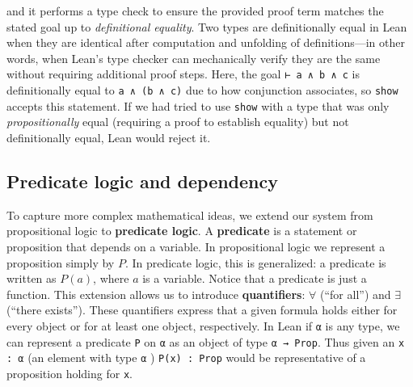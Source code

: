 \begin{example}
  and it performs a type check to ensure the provided proof term matches the stated
  goal up to \emph{definitional equality}.
  Two types are definitionally equal in Lean when they are identical after computation
  and unfolding of definitions—in other words, when Lean's type checker
  can mechanically verify they are the same without requiring additional proof steps.
  Here, the goal \lstinline[language=lean]|⊢ a ∧ b ∧ c| is definitionally
  equal to \lstinline[language=lean]|a ∧ (b ∧ c)| due to how conjunction
  associates, so \lstinline[language=lean]|show| accepts this statement.
  If we had tried to use \lstinline[language=lean]|show| with a type that
  was only \emph{propositionally} equal (requiring a proof to establish equality)
  but not definitionally equal, Lean would reject it.
\end{example}
\subsection{Predicate logic and dependency}
To capture more complex mathematical ideas, we extend our system from
propositional logic to \textbf{predicate logic}.
A \textbf{predicate} is a statement or proposition that depends on a variable.
In propositional logic we represent a proposition simply by $P$.
In predicate logic, this is generalized: a predicate is written as $P(a)$,
where $a$ is a variable. Notice that a predicate is just a function.
This extension allows us to introduce \textbf{quantifiers}:
$\forall$ (``for all'') and $\exists$ (``there exists'').
These quantifiers express that a given formula holds either for every object
or for at least one object, respectively.
In Lean if \lstinline[language=lean]|α| is any type, we can represent a
predicate \lstinline[language=lean]|P| on \lstinline[language=lean]|α| as
an object of type \lstinline[language=lean]|α → Prop|.
Thus given an \lstinline[language=lean]|x : α| (an element
with type \lstinline[language=lean]|α| )
\lstinline[language=lean]|P(x) : Prop| would be representative of a proposition
holding for \lstinline[language=lean]|x|.

